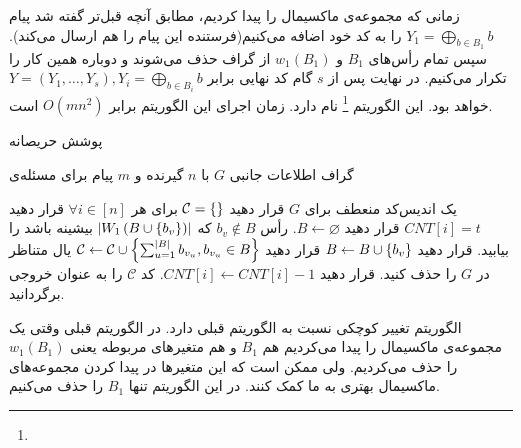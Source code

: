 زمانی که مجموعه‌ی ماکسیمال را پیدا کردیم، مطابق آنچه قبل‌تر گفته شد پیام
$Y_1 = \bigoplus\limits_{b \in B_1} b$
را به کد خود اضافه می‌کنیم(فرستنده این پیام را هم ارسال می‌کند). سپس تمام رأس‌های
$B_1$
و
$w_1(B_1)$
از گراف حذف می‌شوند و دوباره همین کار را تکرار می‌کنیم. در نهایت پس از
$s$
گام کد نهایی برابر
$Y = (Y_1, \ldots, Y_s), Y_i =  \bigoplus\limits_{b \in B_i} b$
خواهد بود. این الگوریتم
\GRCOVone\footnote{}
نام دارد. زمان اجرای این الگوریتم برابر
$O(mn^2)$
است.
\begin{algorithm}
    \caption[
        پوشش حریصانه
    ]{
        پوشش حریصانه
        \cite{pliable2015paper}}
    \label{algorithm:grcov}
    \begin{algorithmic}[1]
        \Require
        گراف اطلاعات جانبی
        $G$
        با
        $n$
        گیرنده و
        $m$
        پیام برای مسئله‌ی

        \Ensure
        یک اندیس‌کد منعطف برای
        $G$
        \State
        قرار دهید
        $\mathcal{C} = \left\{  \right\}$
        \State برای هر
        $\forall i \in [n]$
        قرار دهید
        $CNT[i] = t$
            \State
            قرار دهید
            $B \leftarrow \varnothing$.
                \State
                رأس
                $b_v \notin B$
                که
                $\left|{W_1\left(B \cup\left\{ b_v \right\}\right)}\right|$
                بیشینه باشد را بیابید.
                \State قرار دهید
                $B \leftarrow B \cup\left\{ b_v \right\}$
            \EndWhile
            \State قرار دهید
            $\mathcal{C} \leftarrow \mathcal{C} \cup\left\{ \sum_{u=1}^{\left|{B}\right|} b_{v_u}, b_{v_u} \in B \right\}$
                    \State یال متناظر در
                    $G$
                    را حذف کنید.
                \EndIf
                \State قرار دهید $CNT[i] \leftarrow CNT[i]-1$.
            \EndFor
        \EndWhile
        \State کد
        $\mathcal{C}$
        را به عنوان خروجی برگردانید.
    \end{algorithmic}
\end{algorithm}

الگوریتم
تغییر کوچکی نسبت به الگوریتم قبلی دارد. در الگوریتم قبلی وقتی یک مجموعه‌ی ماکسیمال را پیدا می‌کردیم هم
$B_1$
و هم متغیرهای مربوطه یعنی
$w_1(B_1)$
را حذف می‌کردیم. ولی ممکن است که این متغیرها در پیدا کردن مجموعه‌های ماکسیمال بهتری به ما کمک کنند. در این الگوریتم تنها
$B_1$
را حذف می‌کنیم.

